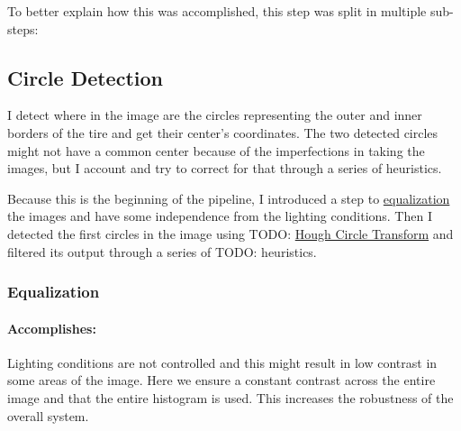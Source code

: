 To better explain how this was accomplished, this step was split in multiple sub-steps:

\subsection{Circle Detection}

I detect where in the image are the circles representing the outer and inner borders of the tire and get their center’s coordinates. The two detected circles might not have a common center because of the imperfections in taking the images, but I account and try to correct for that through a series of heuristics.

Because this is the beginning of the pipeline, I introduced a step to \hyperref[subsubsec:equalization]{equalization} the images and have some independence from the lighting conditions. Then I detected the first circles in the image using TODO: \hyperref[subsubsec:hough_circle_transform]{Hough Circle Transform} and filtered its output through a series of TODO: heuristics.

\subsubsection{Equalization}
\label{subsubsec:equalization}

\paragraph*{Accomplishes:}\mbox{}\par
Lighting conditions are not controlled and this might result in low contrast in some areas of the image. Here we ensure a constant contrast across the entire image and that the entire histogram is used. This increases the robustness of the overall system.

